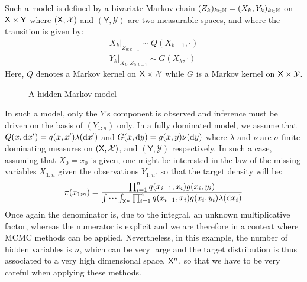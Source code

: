 \documentclass[english,graybox,envcountchap,envcountsame,sectrefs,shortlabels]{svmono}
\theoremstyle{style}
\newcommand{\Yset}{\mathsf{Y}}
\newcommand{\Ysigma}{\mathcal{Y}}
\begin{document}
Such a model is defined by a bivariate Markov chain $(Z_k)_{k\in\mathbb{N}}=(X_k,Y_k)_{k\in\mathbb{N}}$ on $\Xset\times\Yset$ where $(\mathsf{X},\mathcal{X})$ and $(\Yset,\Ysigma)$ are two measurable spaces, and where the transition is given by:
\begin{align*}
X_k|_{Z_{0:k-1}} \sim Q(X_{k-1},\cdot)\\
Y_k|_{X_k,Z_{0:k-1}} \sim G(X_k,\cdot)
\end{align*}
Here, $Q$ denotes a Markov kernel on $\mathsf{X} \times \mathcal{X}$ while $G$ is a Markov kernel on $\Xset \times \Ysigma$.


\begin{figure}[!h]
\begin{center}
\end{center}

\caption{A hidden Markov model}
\label{hmm}
\end{figure}
In such a model, only the $Y$'s component is observed and inference must be driven on the basis of $(Y_{1:n})$ only.
In a fully dominated model, we assume that $Q(x,\mathrm{d} x')=q(x,x') \lambda(\mathrm{d} x')$ and $G(x,\mathrm{d} y)=g(x,y) \nu(\mathrm{d} y)$ where $\lambda$ and $\nu$ are $\sigma$-finite dominating measures on $(\mathsf{X},\mathcal{X})$, and $(\Yset, \Ysigma)$ respectively. In such a case, assuming that $X_0=x_0$ is given, one might be interested in the law of the missing variables $X_{1:n}$ given the observations $Y_{1:n}$, so that the target density will be:
$$
\pi(x_{1:n})=\frac{\prod_{i=1}^{n} q(x_{i-1},x_i)g(x_i,y_i)}{\idotsint_{\mathsf{X}^n} \prod_{i=1}^{n} q(x_{i-1},x_i)g(x_i,y_i) \lambda(\mathrm{d} x_i)}
$$
Once again the denominator is, due to the integral, an unknown multiplicative factor, whereas the numerator is explicit and we are therefore in a context where MCMC methods can be applied. Nevertheless, in this example, the number of hidden variables is $n$, which can be very large and the target distribution is thus associated to a very high dimensional space, $\mathsf{X}^n$, so that we have to be very careful when applying these methods.
\end{document}
